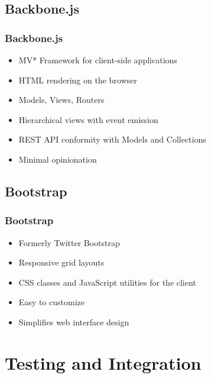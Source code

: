 \documentclass{beamer}
\begin{document}
\subsection{Backbone.js}
\begin{frame}[fragile]
\frametitle{Backbone.js}
	\begin{itemize}
  	 \item MV* Framework for client-side applications
	 \item HTML rendering on the browser
	 \item Models, Views, Routers
  	 \item Hierarchical views with event emission
	 \item REST API conformity with Models and Collections
	 \item Minimal opinionation
	\end{itemize}
\end{frame}

\subsection{Bootstrap}
\begin{frame}[fragile]
\frametitle{Bootstrap}
	\begin{itemize}
  	 \item Formerly Twitter Bootstrap
	 \item Responsive grid layouts
	 \item CSS classes and JavaScript utilities for the client
  	 \item Easy to customize
	 \item Simplifies web interface design
	\end{itemize}
\end{frame}


\section{Testing and Integration}
\end{document}
